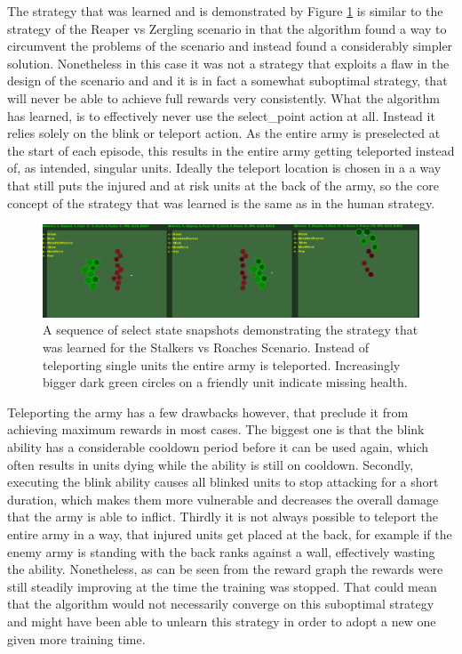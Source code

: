 The strategy that was learned and is demonstrated by Figure \ref{fig:srstrat} is similar to the strategy of the Reaper vs Zergling scenario in that the algorithm found a way to circumvent the problems of the scenario and instead found a considerably simpler solution. Nonetheless in this case it was not a strategy that exploits a flaw in the design of the scenario and and it is in fact a somewhat suboptimal strategy, that will never be able to achieve full rewards very consistently. What the algorithm has learned, is to effectively never use the select\_point action at all. Instead it relies solely on the blink or teleport action. As the entire army is preselected at the start of each episode, this results in the entire army getting teleported instead of, as intended, singular units. Ideally the teleport location is chosen in a a way that still puts the injured and at risk units at the back of the army, so the core concept of the strategy that was learned is the same as in the human strategy. 

\begin{figure}[htb]
  \centering
      \includegraphics[width=1\textwidth]{Figures/sr_strategy.png}
  \caption{A sequence of select state snapshots demonstrating the strategy that was learned for the Stalkers vs Roaches Scenario. Instead of teleporting single units the entire army is teleported. Increasingly bigger dark green circles on a friendly unit indicate missing health.}
  \label{fig:srstrat}
\end{figure}


Teleporting the army has a few drawbacks however, that preclude it from achieving maximum rewards in most cases. The biggest one is that the blink ability has a considerable cooldown period before it can be used again, which often results in units dying while the ability is still on cooldown. Secondly, executing the blink ability causes all blinked units to stop attacking for a short duration, which makes them more vulnerable and decreases the overall damage that the army is able to inflict. Thirdly it is not always possible to teleport the entire army in a way, that injured units get placed at the back, for example if the enemy army is standing with the back ranks against a wall, effectively wasting the ability. Nonetheless, as can be seen from the reward graph the rewards were still steadily improving at the time the training was stopped. That could mean that the algorithm would not necessarily converge on this suboptimal strategy and might have been able to unlearn this strategy in order to adopt a new one given more training time.   

